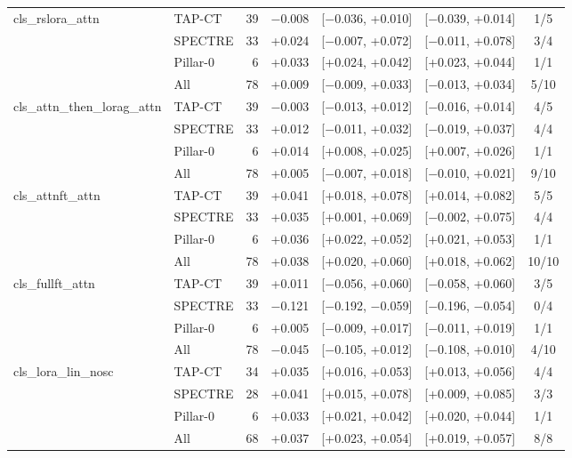 \begin{tabular}{@{}llrrccc@{}}
\addlinespace[2pt]
cls\_rslora\_attn & TAP-CT & 39 & $-$0.008 & [$-$0.036, +0.010] & [$-$0.039, +0.014] & 1/5 \\
 & SPECTRE & 33 & +0.024 & [$-$0.007, +0.072] & [$-$0.011, +0.078] & 3/4 \\
 & Pillar-0 & 6 & +0.033 & [+0.024, +0.042] & [+0.023, +0.044] & 1/1 \\
 & All & 78 & +0.009 & [$-$0.009, +0.033] & [$-$0.013, +0.034] & 5/10 \\
\addlinespace[2pt]
cls\_attn\_then\_lorag\_attn & TAP-CT & 39 & $-$0.003 & [$-$0.013, +0.012] & [$-$0.016, +0.014] & 4/5 \\
 & SPECTRE & 33 & +0.012 & [$-$0.011, +0.032] & [$-$0.019, +0.037] & 4/4 \\
 & Pillar-0 & 6 & +0.014 & [+0.008, +0.025] & [+0.007, +0.026] & 1/1 \\
 & All & 78 & +0.005 & [$-$0.007, +0.018] & [$-$0.010, +0.021] & 9/10 \\
\addlinespace[2pt]
cls\_attnft\_attn & TAP-CT & 39 & +0.041 & [+0.018, +0.078] & [+0.014, +0.082] & 5/5 \\
 & SPECTRE & 33 & +0.035 & [+0.001, +0.069] & [$-$0.002, +0.075] & 4/4 \\
 & Pillar-0 & 6 & +0.036 & [+0.022, +0.052] & [+0.021, +0.053] & 1/1 \\
 & All & 78 & +0.038 & [+0.020, +0.060] & [+0.018, +0.062] & 10/10 \\
\addlinespace[2pt]
cls\_fullft\_attn & TAP-CT & 39 & +0.011 & [$-$0.056, +0.060] & [$-$0.058, +0.060] & 3/5 \\
 & SPECTRE & 33 & $-$0.121 & [$-$0.192, $-$0.059] & [$-$0.196, $-$0.054] & 0/4 \\
 & Pillar-0 & 6 & +0.005 & [$-$0.009, +0.017] & [$-$0.011, +0.019] & 1/1 \\
 & All & 78 & $-$0.045 & [$-$0.105, +0.012] & [$-$0.108, +0.010] & 4/10 \\
\addlinespace[2pt]
cls\_lora\_lin\_nosc & TAP-CT & 34 & +0.035 & [+0.016, +0.053] & [+0.013, +0.056] & 4/4 \\
 & SPECTRE & 28 & +0.041 & [+0.015, +0.078] & [+0.009, +0.085] & 3/3 \\
 & Pillar-0 & 6 & +0.033 & [+0.021, +0.042] & [+0.020, +0.044] & 1/1 \\
 & All & 68 & +0.037 & [+0.023, +0.054] & [+0.019, +0.057] & 8/8 \\
\bottomrule
\end{tabular}
